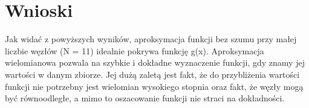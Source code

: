 \documentclass{article}
\begin{document}
\section{Wnioski}
Jak widać z powyższych wyników, aproksymacja funkcji bez szumu przy małej liczbie węzłów (N = 11)
idealnie pokrywa funkcję g(x). Aproksymacja wielomianowa pozwala na szybkie i dokładne wyznaczenie funkcji, gdy znamy jej wartości w
danym zbiorze. Jej dużą zaletą jest fakt, że do przybliżenia wartości funkcji nie potrzebny jest wielomian
wysokiego stopnia oraz fakt, że węzły mogą być równoodległe, a mimo to oszacowanie funkcji nie straci na
dokładności.
\end{document}
